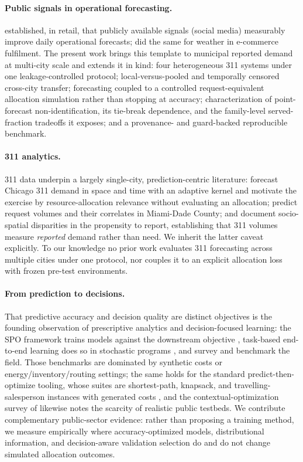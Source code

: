\paragraph{Public signals in operational forecasting.}
\citet{cui2018operational} established, in retail, that publicly
available signals (social media) measurably improve daily operational
forecasts; \citet{steinker2017value} did the same for weather in
e-commerce fulfilment. The present work brings this template to
municipal reported demand at multi-city scale and extends it in kind:
four heterogeneous 311 systems under one leakage-controlled protocol;
local-versus-pooled and temporally censored cross-city transfer;
forecasting coupled to a controlled request-equivalent allocation
simulation rather than stopping at accuracy; characterization of
point-forecast non-identification, its tie-break dependence, and the
family-level served-fraction tradeoffs it exposes; and a provenance- and
guard-backed reproducible benchmark.

\paragraph{311 analytics.}
311 data underpin a largely single-city, prediction-centric literature:
\citet{xu2017predicting} forecast Chicago 311 demand in space and time
with an adaptive kernel and motivate the exercise by resource-allocation
relevance without evaluating an allocation; \citet{cheng2022machine}
predict request volumes and their correlates in Miami-Dade County; \citet{kontokosta2017equity} and
\citet{kontokosta2021bias} document socio-spatial disparities in the
propensity to report, establishing that 311 volumes measure
\emph{reported} demand rather than need. We inherit the latter caveat
explicitly. To our knowledge no prior work evaluates 311 forecasting
across multiple cities under one protocol, nor couples it to an explicit
allocation loss with frozen pre-test environments.

\paragraph{From prediction to decisions.}
That predictive accuracy and decision quality are distinct objectives is
the founding observation of prescriptive analytics
\citep{bertsimas2020predictive} and decision-focused learning: the SPO
framework trains models against the downstream objective
\citep{elmachtoub2022smart}, task-based end-to-end learning does so in
stochastic programs \citep{donti2017task}, and \citet{mandi2024decision}
survey and benchmark the field. Those benchmarks are dominated by
synthetic costs or energy/inventory/routing settings; the same holds for
the standard predict-then-optimize tooling, whose suites are
shortest-path, knapsack, and travelling-salesperson instances with
generated costs \citep{tang2024pyepo}, and the contextual-optimization
survey of \citet{sadana2025survey} likewise notes the scarcity of
realistic public testbeds. We contribute
complementary public-sector evidence: rather than proposing a training
method, we measure empirically where accuracy-optimized models,
distributional information, and decision-aware validation selection do
and do not change simulated allocation outcomes.

